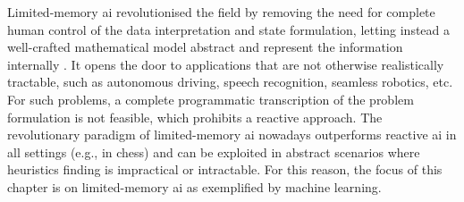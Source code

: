 Limited-memory \gls{ai} revolutionised the field by removing the need for complete human control of the data interpretation and state formulation, letting instead a well-crafted mathematical model abstract and represent the information internally \cite{russel2010}. It opens the door to applications that are not otherwise realistically tractable, such as autonomous driving, speech recognition, seamless robotics, etc. For such problems, a complete programmatic transcription of the problem formulation is not feasible, which prohibits a reactive approach. The revolutionary paradigm of limited-memory \gls{ai} nowadays outperforms reactive \gls{ai} in all settings (e.g., in chess) and can be exploited in abstract scenarios where heuristics finding is impractical or intractable. For this reason, the focus of this chapter is on limited-memory \gls{ai} as exemplified by machine learning. 

